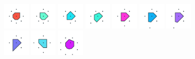 \documentclass[text.tex]{subfiles}
\begin{document}
\begin{figure}[h!]
\includegraphics[width=0.12\textwidth]{img/results/circle8/circle8_121607_(4546_-1881alpha_4)_005.pdf}
\includegraphics[width=0.12\textwidth]{img/results/circle8/circle8_121607_(4546_-1881alpha_4)_006.pdf}
\includegraphics[width=0.12\textwidth]{img/results/circle8/circle8_121607_(4546_-1881alpha_4)_007.pdf}
\includegraphics[width=0.12\textwidth]{img/results/circle8/circle8_121607_(4546_-1881alpha_4)_008.pdf}
\includegraphics[width=0.12\textwidth]{img/results/circle8/circle8_121607_(4546_-1881alpha_4)_009.pdf}
\includegraphics[width=0.12\textwidth]{img/results/circle8/circle8_121607_(4546_-1881alpha_4)_010.pdf}
\includegraphics[width=0.12\textwidth]{img/results/circle8/circle8_121607_(4546_-1881alpha_4)_011.pdf}
\includegraphics[width=0.12\textwidth]{img/results/circle8/circle8_121607_(4546_-1881alpha_4)_012.pdf}
\includegraphics[width=0.12\textwidth]{img/results/circle8/circle8_121607_(4546_-1881alpha_4)_013.pdf}
\includegraphics[width=0.12\textwidth]{img/results/circle8/circle8_121607_(4546_-1881alpha_4)_014.pdf}
\end{figure}
\end{document}
